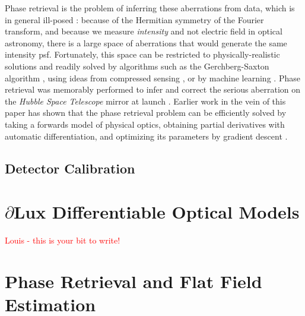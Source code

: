 \documentclass[twocolumn]{spie}
\newcommand\dlux{$\partial$Lux\xspace}
\begin{document}
Phase retrieval is the problem of inferring these aberrations from data\cite{schechtman2014}, which is in general ill-posed \cite{barnett2020}: because of the Hermitian symmetry of the Fourier transform, and because we measure \textit{intensity} and not electric field in optical astronomy, there is a large space of aberrations that would generate the same intensity \ac{psf}. Fortunately, this space can be restricted to physically-realistic solutions and readily solved by algorithms such as the Gerchberg-Saxton algorithm \cite{gerchberg1972}, using ideas from compressed sensing \cite{candes2011}, or by machine learning \cite{metzler2018,isil2019,nishizaki2020}.  Phase retrieval was memorably performed to infer and correct the serious aberration on the \textit{Hubble Space Telescope} mirror at launch \cite{hubble_phase_ret}. 
Earlier work in the vein of this paper has shown that the phase retrieval problem can be efficiently solved by taking a forwards model of physical optics, obtaining partial derivatives with automatic differentiation, and optimizing its parameters by gradient descent \cite{jurling_fienup,phase_ret_and_design}.

\subsection{Detector Calibration}


\section{\dlux Differentiable Optical Models}
\label{sec:dlux}
\textcolor{red}{Louis - this is your bit to write!}



\section{Phase Retrieval and Flat Field Estimation}
\label{sec:phaseretrieval}
\end{document}
